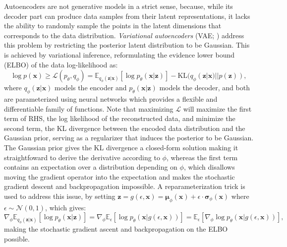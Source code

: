 Autoencoders are not generative models in a strict sense, because, while its decoder part can produce data samples from their latent representations, it lacks the ability to randomly sample the points in the latent dimensions that corresponds to the data distribution.
\emph{Variational autoencoders} (VAE;  ) address this problem by restricting the posterior latent distribution to be Gaussian.
This is achieved by variational inference, reformulating the evidence lower bound (ELBO) of the data log-likelihood as:
\begin{equation}\label{eqn:vae}
\log p(\bm{x}) \ge \mathcal{L}(p_\theta, q_\phi) = \mathbb{E}_{q_\phi(\bm{z}|\bm{x})} [\log p_\theta(\bm{x}|\bm{z})] - \mathrm{KL}(q_\phi(\bm{z}|\bm{x}) || p(\bm{z})),
\end{equation}
where $q_\phi(\bm{z}|\bm{x})$ models the encoder and $p_\theta(\bm{x}|\bm{z})$ models the decoder, and both are parameterized using neural networks which provides a flexible and differentiable family of functions.
Note that maximizing $\mathcal{L}$ will maximize the first term of RHS, the log likelihood of the reconstructed data, and minimize the second term, the KL divergence between the encoded data distribution and the Gaussian prior, serving as a regularizer that induces the posterior to be Gaussian.
The Gaussian prior gives the KL divergence a closed-form solution making it straightfoward to derive the derivative according to $\phi$, whereas the first term contains an expectation over a distribution depending on $\phi$, which disallows moving the gradient operator into the expectation and makes the stochastic gradient descent and backpropagation impossible.
A reparameterization trick is used to address this issue, by setting $\bm{z} = g({\epsilon}, \bm{x}) = \bm{\mu}_\phi (\bm{x}) + {\epsilon} \cdot \bm{\sigma}_\phi(\bm{x})$ where $\epsilon \sim \mathcal{N}(0, 1)$, which gives:
\begin{equation}\label{eqn:reparam}
\nabla_\phi \mathbb{E}_{q_\phi(\bm{z}|\bm{x})} [\log p_\theta(\bm{x}|\bm{z})] = \nabla_\phi \mathbb{E}_{\epsilon} [\log p_\theta(\bm{x}|g(\epsilon, \bm{x}))] = 
\mathbb{E}_{\epsilon} [\nabla_\phi \log p_\theta(\bm{x}|g(\epsilon, \bm{x}))],
\end{equation}
making the stochastic gradient ascent and backpropagation on the ELBO possible.


